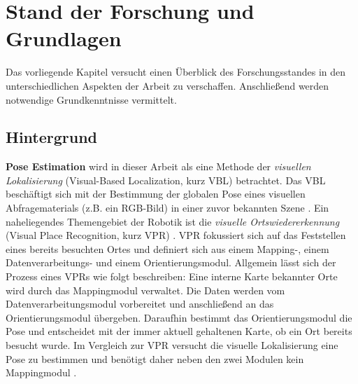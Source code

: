
\section{Stand der Forschung und Grundlagen}
\label{sec:kapitel_2}
Das vorliegende Kapitel versucht einen Überblick des Forschungsstandes in den unterschiedlichen Aspekten der Arbeit zu verschaffen. Anschließend werden notwendige Grundkenntnisse vermittelt.

\subsection{Hintergrund}

\textbf{Pose Estimation} wird in dieser Arbeit als eine Methode der \textit{visuellen Lokalisierung} (Visual-Based Localization, kurz VBL) betrachtet. Das VBL beschäftigt sich mit der Bestimmung der globalen Pose eines visuellen Abfragematerials (z.B. ein RGB-Bild) in einer zuvor bekannten Szene \cite{piascoSurveyVisualBasedLocalization2018}.
Ein naheliegendes Themengebiet der Robotik ist die \textit{visuelle Ortswiedererkennung} (Visual Place Recognition, kurz VPR) \cite{lowryVisualPlaceRecognition2016}. VPR fokussiert sich auf das Feststellen eines bereits besuchten Ortes und definiert sich aus einem Mapping-, einem Datenverarbeitungs- und einem Orientierungsmodul. Allgemein lässt sich der Prozess eines VPRs wie folgt beschreiben: Eine interne Karte bekannter Orte wird durch das Mappingmodul verwaltet. Die Daten werden vom Datenverarbeitungsmodul vorbereitet und anschließend an das Orientierungsmodul übergeben. Daraufhin bestimmt das Orientierungsmodul die Pose und entscheidet mit der immer aktuell gehaltenen Karte, ob ein Ort bereits besucht wurde. Im Vergleich zur VPR versucht die visuelle Lokalisierung eine Pose zu bestimmen und benötigt daher neben den zwei Modulen kein Mappingmodul \cite{lowryVisualPlaceRecognition2016}.

